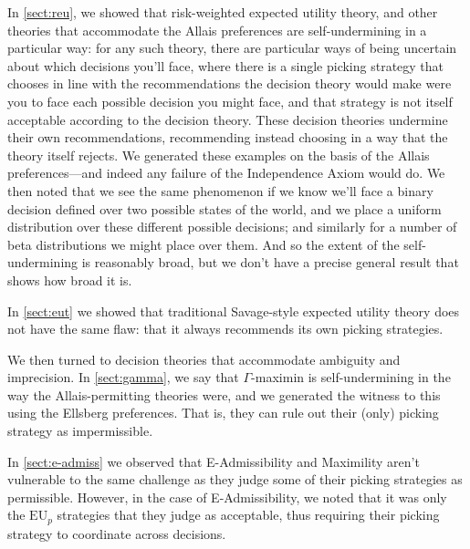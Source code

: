 \documentclass[a4paper]{article}
\renewcommand\P{\mathbb{P}} %
\newcommand\EU{\mathrm{EU}}
\newcommand{\IP}{\P}
\newcommand{\todoold}[2][]{\todo[backgroundcolor=white,bordercolor=orange!10,linecolor=gray!10, #1,caption={},textcolor=gray]{Pre-rev: #2}}
\newenvironment{CCM rewritten}
{\begingroup\color{blue}} %
{\endgroup}              %
\begin{document}
In \cref{sect:reu}, we showed that risk-weighted expected utility theory, and other theories that accommodate the Allais preferences are self-undermining in a particular way: for any such theory, there are particular ways of being uncertain about which decisions you'll face, where there is a single picking strategy that chooses in line with the recommendations the decision theory would make were you to face each possible decision you might face, and that strategy is not itself acceptable according to the decision theory. These decision theories undermine their own recommendations, recommending instead choosing in a way that the theory itself rejects. We generated these examples on the basis of the Allais preferences---and indeed any failure of the Independence Axiom would do. We then noted that we see the same phenomenon if we know we'll face a binary decision defined over two possible states of the world, and we place a uniform distribution over these different possible decisions; and similarly for a number of beta distributions we might place over them. And so the extent of the self-undermining is reasonably broad, but we don't have a precise general result that shows how broad it is.

In \cref{sect:eut} we showed that traditional Savage-style expected utility theory does not have the same flaw: that it always recommends its own picking strategies.

We then turned to decision theories that accommodate ambiguity and imprecision. In \cref{sect:gamma}, we say that $\Gamma$-maximin is self-undermining in the way the Allais-permitting theories were, and we generated the witness to this using the Ellsberg preferences.\todoold{are we going to say something about} That is, they can rule out their (only) picking strategy as impermissible. 

In \cref{sect:e-admiss} we observed that E-Admissibility and Maximility aren't vulnerable to the same challenge as they judge some of their picking strategies as permissible. However, in the case of E-Admissibility, we noted that it was only the $\EU_p$ strategies that they judge as acceptable, thus requiring their picking strategy to coordinate across decisions. 

\end{document}
